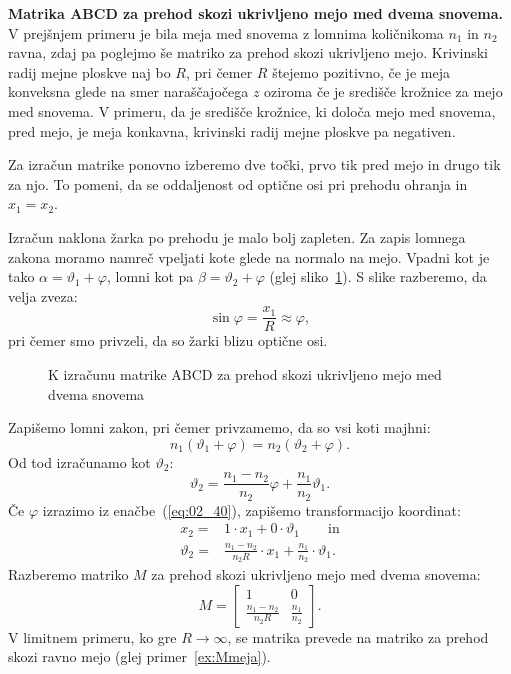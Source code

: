 \begin{example}
\label{ex:MUmeja}
{\bf Matrika ABCD za prehod skozi ukrivljeno mejo med dvema snovema.} V prejšnjem 
primeru je bila meja med snovema z lomnima količnikoma $n_1$ in $n_2$ ravna, zdaj pa 
poglejmo še matriko za prehod skozi ukrivljeno mejo. Krivinski radij mejne ploskve
naj bo $R$, pri čemer $R$ štejemo pozitivno, če je meja konveksna glede na smer
naraščajočega $z$ oziroma če je središče krožnice za mejo med snovema. V primeru, 
da je središče krožnice, ki določa mejo med snovema, pred mejo, je meja konkavna, 
krivinski radij mejne ploskve pa negativen. 

Za izračun matrike ponovno izberemo dve točki, prvo tik pred mejo in 
drugo tik za njo. To pomeni, da se oddaljenost od optične osi
pri prehodu ohranja in $x_1 = x_2$. 

Izračun naklona žarka po prehodu je malo bolj zapleten. Za zapis lomnega 
zakona moramo namreč vpeljati kote glede na normalo na
mejo. Vpadni kot je tako $\alpha = \vartheta_1 + \varphi$, lomni kot pa 
$\beta = \vartheta_2 + \varphi$ (glej sliko~\ref{fig:02_ABCD3}).
S slike razberemo, da velja zveza:
\begin{equation}
 \sin \varphi = \frac{x_1}{R} \approx \varphi,
 \label{eq:02_40}
\end{equation}
pri čemer smo privzeli, da so žarki blizu optične osi. 
\begin{figure}[!h]
\centering
\def\svgwidth{70truemm} 

\caption{K izračunu matrike ABCD za prehod skozi ukrivljeno mejo med dvema snovema}
\label{fig:02_ABCD3}
\end{figure}

Zapišemo lomni zakon,
pri čemer privzamemo, da so vsi koti majhni:
\begin{equation}
n_1 (\vartheta_1 + \varphi) = n_2 (\vartheta_2 + \varphi).
\label{eq:02_41}
\end{equation}
Od tod izračunamo kot $\vartheta_2$:
\begin{equation}
 \vartheta_2 = \frac{n_1-n_2}{n_2}\varphi + \frac{n_1}{n_2} \vartheta_1.
 \label{eq:02_42}
 \end{equation}
Če $\varphi$ izrazimo iz enačbe~(\ref{eq:02_40}), zapišemo transformacijo koordinat:
\begin{align}
 x_2 =& 1\cdot x_1 + 0\cdot \vartheta_1 \qquad \mathrm{in} \\
 \vartheta_2 =& \frac{n_1-n_2}{n_2R}\cdot x_1 + \frac{n_1}{n_2}\cdot \vartheta_1.
 \label{eq:02_43}
\end{align}
Razberemo matriko $M$ za prehod skozi ukrivljeno mejo med dvema snovema:
\begin{equation}
M = \left[\begin{array}{cc}
1& 0\\
\frac{n_1-n_2}{n_2R}&\frac{n_1}{n_2}
\end{array}\right]\!\!.
 \label{eq:02_44}
\end{equation}
V limitnem primeru, ko gre $R \to \infty$, se matrika prevede na matriko za
prehod skozi ravno mejo (glej primer~\ref{ex:Mmeja}).
\end{example}

